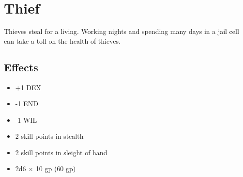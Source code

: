 \section{Thief}\label{background:thief}
Thieves steal for a living. Working nights and spending many days in a jail
cell can take a toll on the health of thieves.

\subsection*{Effects}
\begin{itemize}
    \item +1 DEX
    \item -1 END
    \item -1 WIL
    \item 2 skill points in stealth
    \item 2 skill points in sleight of hand
    \item 2d6 $\times$ 10 gp (60 gp)
\end{itemize}
